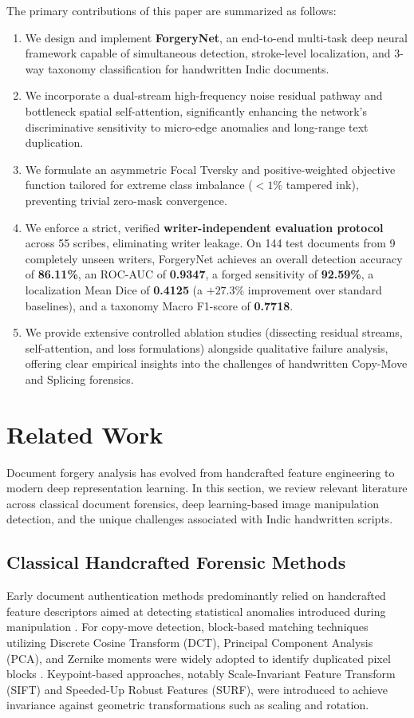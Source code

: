 \documentclass[pdflatex,sn-mathphys-num,iicol]{sn-jnl}
\begin{document}
\noindent
The primary contributions of this paper are summarized as follows:
\begin{enumerate}[1.]
    \item We design and implement \textbf{ForgeryNet}, an end-to-end multi-task deep neural framework capable of simultaneous detection, stroke-level localization, and 3-way taxonomy classification for handwritten Indic documents.
    \item We incorporate a dual-stream high-frequency noise residual pathway and bottleneck spatial self-attention, significantly enhancing the network's discriminative sensitivity to micro-edge anomalies and long-range text duplication.
    \item We formulate an asymmetric Focal Tversky and positive-weighted objective function tailored for extreme class imbalance ($<1\%$ tampered ink), preventing trivial zero-mask convergence.
    \item We enforce a strict, verified \textbf{writer-independent evaluation protocol} across 55 scribes, eliminating writer leakage. On 144 test documents from 9 completely unseen writers, ForgeryNet achieves an overall detection accuracy of \textbf{86.11\%}, an ROC-AUC of \textbf{0.9347}, a forged sensitivity of \textbf{92.59\%}, a localization Mean Dice of \textbf{0.4125} (a $+27.3\%$ improvement over standard baselines), and a taxonomy Macro F1-score of \textbf{0.7718}.
    \item We provide extensive controlled ablation studies (dissecting residual streams, self-attention, and loss formulations) alongside qualitative failure analysis, offering clear empirical insights into the challenges of handwritten Copy-Move and Splicing forensics.
\end{enumerate}

\section{Related Work}\label{sec2}

Document forgery analysis has evolved from handcrafted feature engineering to modern deep representation learning. In this section, we review relevant literature across classical document forensics, deep learning-based image manipulation detection, and the unique challenges associated with Indic handwritten scripts.

\subsection{Classical Handcrafted Forensic Methods}\label{subsec2_1}
Early document authentication methods predominantly relied on handcrafted feature descriptors aimed at detecting statistical anomalies introduced during manipulation \cite{bib1}. For copy-move detection, block-based matching techniques utilizing Discrete Cosine Transform (DCT), Principal Component Analysis (PCA), and Zernike moments were widely adopted to identify duplicated pixel blocks \cite{bib1}. Keypoint-based approaches, notably Scale-Invariant Feature Transform (SIFT) and Speeded-Up Robust Features (SURF), were introduced to achieve invariance against geometric transformations such as scaling and rotation.
\end{document}
